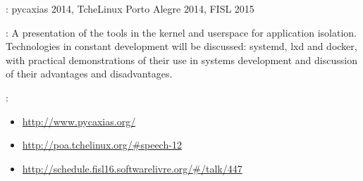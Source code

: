 \begin{description}[noitemsep]
    \item[Events]: pycaxias 2014, TcheLinux Porto Alegre 2014, FISL 2015
    \item[Summary]:
        A presentation of the tools in the kernel and userspace for application
        isolation. Technologies in constant development will be discussed:
        systemd, lxd and docker, with practical demonstrations of their use in
        systems development and discussion of their advantages and
        disadvantages.
    \item[Websites]:
        \begin{itemize}[noitemsep]
            \item \url{http://www.pycaxias.org/}
            \item \url{http://poa.tchelinux.org/#speech-12}
            \item \url{http://schedule.fisl16.softwarelivre.org/#/talk/447}
        \end{itemize}
\end{description}
